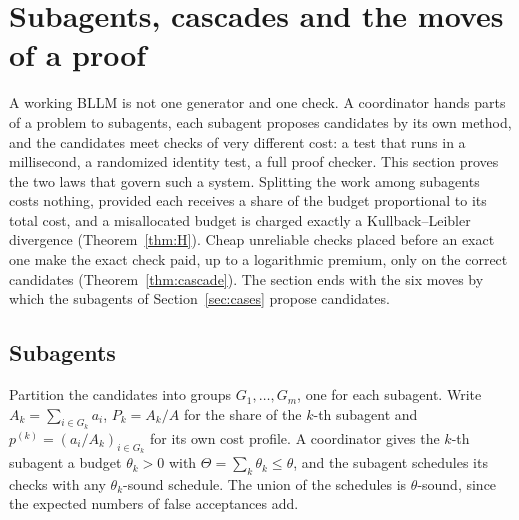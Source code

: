 \section{Subagents, cascades and the moves of a proof}\label{sec:agents}

A working BLLM is not one generator and one check. A coordinator hands parts of a problem to subagents, each subagent proposes candidates by its own method, and the candidates meet checks of very different cost: a test that runs in a millisecond, a randomized identity test, a full proof checker. This section proves the two laws that govern such a system. Splitting the work among subagents costs nothing, provided each receives a share of the budget proportional to its total cost, and a misallocated budget is charged exactly a Kullback--Leibler divergence (Theorem~\ref{thm:H}). Cheap unreliable checks placed before an exact one make the exact check paid, up to a logarithmic premium, only on the correct candidates (Theorem~\ref{thm:cascade}). The section ends with the six moves by which the subagents of Section~\ref{sec:cases} propose candidates.

\subsection{Subagents}

Partition the candidates into groups $G_{1},\dots,G_{m}$, one for each subagent. Write $A_{k}=\sum_{i\in G_{k}}a_{i}$, $P_{k}=A_{k}/A$ for the share of the $k$-th subagent and $p^{(k)}=(a_{i}/A_{k})_{i\in G_{k}}$ for its own cost profile. A coordinator gives the $k$-th subagent a budget $\theta_{k}>0$ with $\Theta=\sum_{k}\theta_{k}\le\theta$, and the subagent schedules its checks with any $\theta_{k}$-sound schedule. The union of the schedules is $\theta$-sound, since the expected numbers of false acceptances add.

